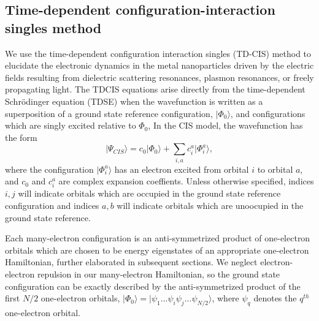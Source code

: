 \documentclass[journal=jacsat,manuscript=article]{achemso}
\begin{document}
\subsection{Time-dependent configuration-interaction singles method}
We use the time-dependent configuration interaction singles (TD-CIS) method to elucidate the
electronic dynamics in the metal nanoparticles driven by the electric fields resulting from 
dielectric scattering resonances, plasmon resonances, or freely propagating light.  
The TDCIS equations arise directly from the time-dependent Schr\"odinger equation (TDSE) when the wavefunction
is written as a superposition of a ground state reference configuration, $|\Phi_0\rangle$, and configurations which are singly excited relative
to $\Phi_0$,  In the CIS model, the wavefunction has the form
\begin{equation}
|\Psi_{CIS}\rangle = c_0 |\Phi_0 \rangle + \sum_{i,a} c_i^a |\Phi_i^a\rangle,
\end{equation}
where the configuration $|\Phi_i^a\rangle$ has an electron excited from orbital $i$ to orbital $a$, 
and $c_0$ and $c_i^a$ are complex expansion coeffients.  Unless otherwise specified, indices $i, j$ will indicate
orbitals which are occupied in the ground state reference configuration and indices $a, b$ will indicate orbitals
which are unoocupied in the ground state reference.

Each many-electron configuration is an anti-symmetrized product of one-electron orbitals which are chosen to be energy eigenstates of 
an appropriate one-electron Hamiltonian, further elaborated in subsequent sections. 
We neglect electron-electron repulsion in our many-electron Hamiltonian, so the ground state configuration
can be exactly described by the anti-symmetrized product of the first $N/2$ one-electron orbitals, 
$|\Phi_0\rangle = |\psi_1 ... \psi_i \psi_j ... \psi_{N/2} \rangle$, where $\psi_q$ denotes the $q^{th}$ one-electron orbital.  
\end{document}
